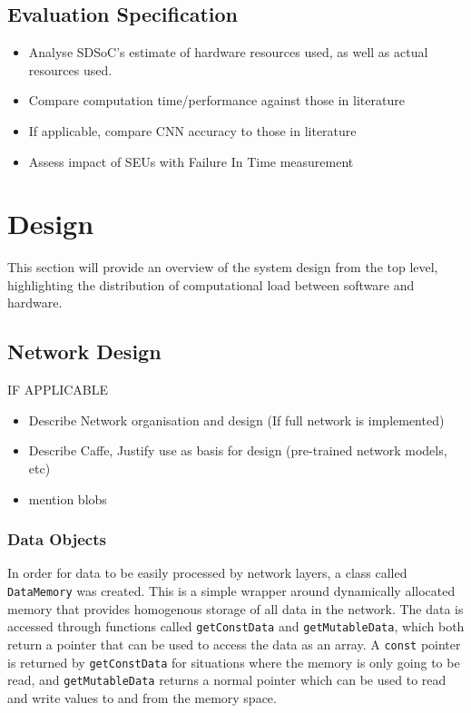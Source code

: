 \documentclass[12pt]{article}
\begin{document}
\subsection{Evaluation Specification}
\label{sec:ProjSpec-EvalSpec}


\begin{itemize}
\item Analyse SDSoC's estimate of hardware resources used, as well as actual resources used.
\item Compare computation time/performance against those in literature
\item If applicable, compare CNN accuracy to those in literature
\item Assess impact of SEUs with Failure In Time measurement
\end{itemize}

\newpage

\section{Design}
\label{sec:Design}

This section will provide an overview of the system design from the top level, highlighting the distribution of computational load between software and hardware.

\subsection{Network Design}
\label{sec:Design-Network}


IF APPLICABLE
\begin{itemize}
\item Describe Network organisation and design (If full network is implemented)
\item Describe Caffe, Justify use as basis for design (pre-trained network models, etc)
\item mention blobs
\end{itemize}

\subsubsection{Data Objects}
\label{sec:Imp-Network-Blobs}

In order for data to be easily processed by network layers, a class called \lstinline|DataMemory| was created. This is a simple wrapper around dynamically allocated memory that provides homogenous storage of all data in the network. The data is accessed through functions called \lstinline|getConstData| and \lstinline|getMutableData|, which both return a pointer that can be used to access the data as an array. A \lstinline|const| pointer is returned by \lstinline|getConstData| for situations where the memory is only going to be read, and \lstinline|getMutableData| returns a normal pointer which can be used to read and write values to and from the memory space.
\end{document}
